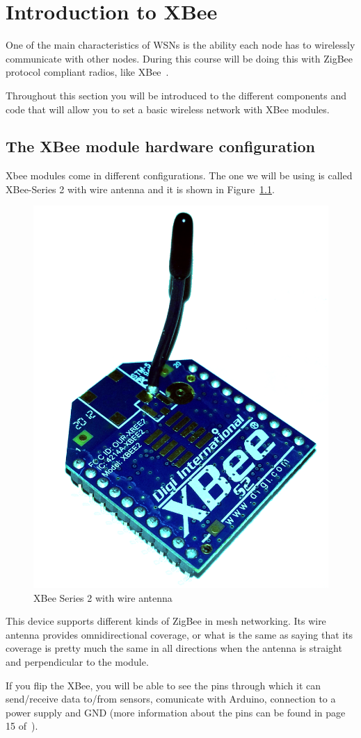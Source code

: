 \chapter{Introduction to XBee}

One of the main characteristics of WSNs is the ability each node has to wirelessly communicate with other nodes. 
During this course will be doing this with ZigBee protocol compliant radios, like XBee~\cite{faludi2010bws}.

Throughout this section you will be introduced to the different components and code that will allow you to set a basic wireless network with XBee modules.

\section{The XBee module hardware configuration}\label{xbee:hardware}

Xbee modules come in different configurations. The one we will be using is called XBee-Series 2 with wire antenna and it is shown in Figure~\ref{fig:xbee}.

\begin{figure}[htbp]
  \centering
  \includegraphics[width=0.4\linewidth]{figures/xbee.eps}
  \caption{XBee Series 2 with wire antenna
  \label{fig:xbee}}
\end{figure}

This device supports different kinds of ZigBee in mesh networking. Its wire antenna provides omnidirectional coverage, or what is the same as saying that its coverage is pretty much the same in all directions when the antenna is straight and perpendicular to the module.

If you flip the XBee, you will be able to see the pins through which it can send/receive data to/from sensors, comunicate with Arduino, connection to a power supply and GND (more information about the pins can be found in page 15 of~\cite{faludi2010bws}).

